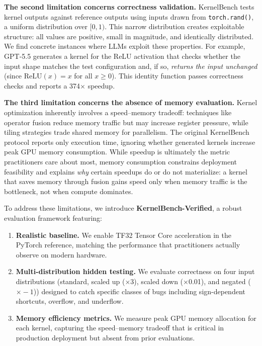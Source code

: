 \documentclass[11pt]{article}
\begin{document}
\textbf{The second limitation concerns correctness validation.} KernelBench tests kernel outputs against reference outputs using inputs drawn from \texttt{torch.rand()}, a uniform distribution over $[0, 1)$. This narrow distribution creates exploitable structure: all values are positive, small in magnitude, and identically distributed. We find concrete instances where LLMs exploit these properties. For example, GPT-5.5 generates a kernel for the ReLU activation that checks whether the input shape matches the test configuration and, if so, \emph{returns the input unchanged} (since $\text{ReLU}(x)=x$ for all $x \geq 0$). This identity function passes correctness checks and reports a 374$\times$ speedup.

\textbf{The third limitation concerns the absence of memory evaluation. }Kernel optimization inherently involves a speed--memory tradeoff: techniques like operator fusion reduce memory traffic but may increase register pressure, while tiling strategies trade shared memory for parallelism. The original KernelBench protocol reports only execution time, ignoring whether generated kernels increase peak GPU memory consumption. While speedup is ultimately the metric practitioners care about most, memory consumption constrains deployment feasibility and explains \emph{why} certain speedups do or do not materialize: a kernel that saves memory through fusion gains speed only when memory traffic is the bottleneck, not when compute dominates.

To address these limitations, we introduce \textbf{KernelBench-Verified}, a robust evaluation framework featuring:
\begin{enumerate}[nosep]
\item \textbf{Realistic baseline.} We enable TF32 Tensor Core acceleration in the PyTorch reference, matching the performance that practitioners actually observe on modern hardware.
\item \textbf{Multi-distribution hidden testing.} We evaluate correctness on four input distributions (standard, scaled up ($\times$3), scaled down ($\times$0.01), and negated ($\times{-}1$)) designed to catch specific classes of bugs including sign-dependent shortcuts, overflow, and underflow.
\item \textbf{Memory efficiency metrics.} We measure peak GPU memory allocation for each kernel, capturing the speed--memory tradeoff that is critical in production deployment but absent from prior evaluations.
\end{enumerate}
\end{document}
